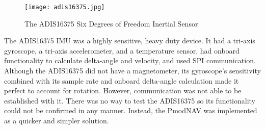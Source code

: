 \begin{figure}[H]
	\centerline{\texttt{[image: adis16375.jpg]}}
	\caption{The ADIS16375 Six Degrees of Freedom Inertial Sensor \cite{adisBreakout}}
	\label{adis16375}
\end{figure}

The ADIS16375 IMU was a highly sensitive, heavy duty device. It had a tri-axis gyroscope, a tri-axis accelerometer, and a temperature sensor, had onboard functionality to calculate delta-angle and velocity, and used SPI communication. Although the ADIS16375 did not have a magnetometer, its gyroscope's sensitivity combined with its sample rate and onboard delta-angle calculation made it perfect to account for rotation. However, communication was not able to be established with it. There was no way to test the ADIS16375 so its functionality could not be confirmed in any manner. Instead, the PmodNAV was implemented as a quicker and simpler solution.




